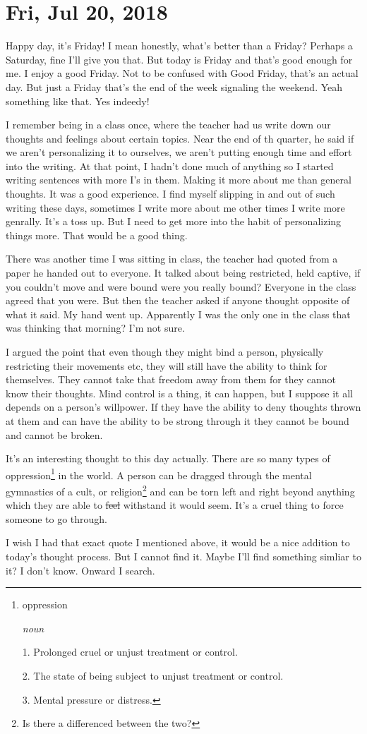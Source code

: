 \section{Fri, Jul 20, 2018}

Happy day, it's Friday! I mean honestly, what's better than a Friday? Perhaps a
Saturday, fine I'll give you that. But today is Friday and that's good enough
for me. I enjoy a good Friday. Not to be confused with Good Friday, that's an
actual day. But just a Friday that's the end of the week signaling the weekend.
Yeah something like that. Yes indeedy!

I remember being in a class once, where the teacher had us write down our
thoughts and feelings about certain topics. Near the end of th quarter, he said
if we aren't personalizing it to ourselves, we aren't putting enough time and
effort into the writing. At that point, I hadn't done much of anything so I
started writing sentences with more I's in them. Making it more about me than
general thoughts. It was a good experience. I find myself slipping in and out of
such writing these days, sometimes I write more about me other times I write
more genrally. It's a toss up. But I need to get more into the habit of
personalizing things more. That would be a good thing.

There was another time I was sitting in class, the teacher had quoted from a
paper he handed out to everyone. It talked about being restricted, held captive,
if you couldn't move and were bound were you really bound? Everyone in the class
agreed that you were. But then the teacher asked if anyone thought opposite of
what it said. My hand went up. Apparently I was the only one in the class that
was thinking that morning? I'm not sure.

I argued the point that even though they might bind a person, physically
restricting their movements etc, they will still have the ability to think for
themselves. They cannot take that freedom away from them for they cannot know
their thoughts. Mind control is a thing, it can happen, but I suppose it all
depends on a person's willpower. If they have the ability to deny thoughts
thrown at them and can have the ability to be strong through it they cannot be
bound and cannot be broken.

It's an interesting thought to this day actually. There are so many types of
oppression\footnote{
oppression

\textit{noun}

1. Prolonged cruel or unjust treatment or control.

2. The state of being subject to unjust treatment or control.

3. Mental pressure or distress.
} in the world. A person can be dragged through the mental gymnastics of a cult,
or religion\footnote{Is there a differenced between the two?} and can be torn
left and right beyond anything which they are able to \st{feel} withstand it 
would seem. It's a cruel thing to force someone to go through.

I wish I had that exact quote I mentioned above, it would be a nice addition to
today's thought process. But I cannot find it. Maybe I'll find something simliar
to it? I don't know. Onward I search.
